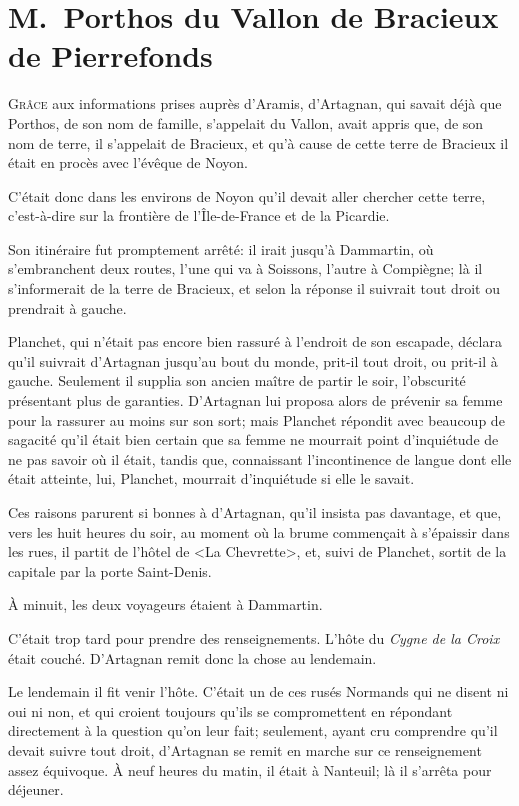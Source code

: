 \chapter{M.~Porthos du Vallon de Bracieux de Pierrefonds}

\lettrine{G}{râce} aux informations prises auprès d'Aramis, d'Artagnan, qui savait déjà que Porthos, de son nom de famille, s'appelait du Vallon, avait appris que, de son nom de terre, il s'appelait de Bracieux, et qu'à cause de cette terre de Bracieux il était en procès avec l'évêque de Noyon.

C'était donc dans les environs de Noyon qu'il devait aller chercher cette terre, c'est-à-dire sur la frontière de l'Île-de-France et de la Picardie.

Son itinéraire fut promptement arrêté: il irait jusqu'à Dammartin, où s'embranchent deux routes, l'une qui va à Soissons, l'autre à Compiègne; là il s'informerait de la terre de Bracieux, et selon la réponse il suivrait tout droit ou prendrait à gauche.

Planchet, qui n'était pas encore bien rassuré à l'endroit de son escapade, déclara qu'il suivrait d'Artagnan jusqu'au bout du monde, prit-il tout droit, ou prit-il à gauche. Seulement il supplia son ancien maître de partir le soir, l'obscurité présentant plus de garanties. D'Artagnan lui proposa alors de prévenir sa femme pour la rassurer au moins sur son sort; mais Planchet répondit avec beaucoup de sagacité qu'il était bien certain que sa femme ne mourrait point d'inquiétude de ne pas savoir où il était, tandis que, connaissant l'incontinence de langue dont elle était atteinte, lui, Planchet, mourrait d'inquiétude si elle le savait.

Ces raisons parurent si bonnes à d'Artagnan, qu'il insista pas davantage, et que, vers les huit heures du soir, au moment où la brume commençait à s'épaissir dans les rues, il partit de l'hôtel de <La Chevrette>, et, suivi de Planchet, sortit de la capitale par la porte Saint-Denis.

À minuit, les deux voyageurs étaient à Dammartin.

C'était trop tard pour prendre des renseignements. L'hôte du \textit{Cygne de la Croix} était couché. D'Artagnan remit donc la chose au lendemain.

Le lendemain il fit venir l'hôte. C'était un de ces rusés Normands qui ne disent ni oui ni non, et qui croient toujours qu'ils se compromettent en répondant directement à la question qu'on leur fait; seulement, ayant cru comprendre qu'il devait suivre tout droit, d'Artagnan se remit en marche sur ce renseignement assez équivoque. À neuf heures du matin, il était à Nanteuil; là il s'arrêta pour déjeuner.

